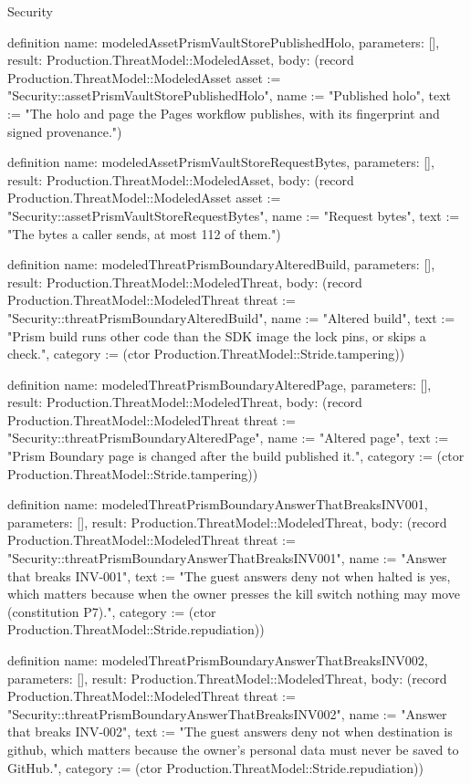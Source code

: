 \begin{lexlean}{Security}
\begin{semanticmodule}
definition{
  name: modeledAssetPrismVaultStorePublishedHolo,
  parameters: [],
  result: Production.ThreatModel::ModeledAsset,
  body: (record Production.ThreatModel::ModeledAsset {asset := "Security::assetPrismVaultStorePublishedHolo", name := "Published holo", text := "The holo and page the Pages workflow publishes, with its fingerprint and signed provenance."})
}

definition{
  name: modeledAssetPrismVaultStoreRequestBytes,
  parameters: [],
  result: Production.ThreatModel::ModeledAsset,
  body: (record Production.ThreatModel::ModeledAsset {asset := "Security::assetPrismVaultStoreRequestBytes", name := "Request bytes", text := "The bytes a caller sends, at most 112 of them."})
}

definition{
  name: modeledThreatPrismBoundaryAlteredBuild,
  parameters: [],
  result: Production.ThreatModel::ModeledThreat,
  body: (record Production.ThreatModel::ModeledThreat {threat := "Security::threatPrismBoundaryAlteredBuild", name := "Altered build", text := "Prism build runs other code than the SDK image the lock pins, or skips a check.", category := (ctor Production.ThreatModel::Stride.tampering)})
}

definition{
  name: modeledThreatPrismBoundaryAlteredPage,
  parameters: [],
  result: Production.ThreatModel::ModeledThreat,
  body: (record Production.ThreatModel::ModeledThreat {threat := "Security::threatPrismBoundaryAlteredPage", name := "Altered page", text := "Prism Boundary page is changed after the build published it.", category := (ctor Production.ThreatModel::Stride.tampering)})
}

definition{
  name: modeledThreatPrismBoundaryAnswerThatBreaksINV001,
  parameters: [],
  result: Production.ThreatModel::ModeledThreat,
  body: (record Production.ThreatModel::ModeledThreat {threat := "Security::threatPrismBoundaryAnswerThatBreaksINV001", name := "Answer that breaks INV-001", text := "The guest answers deny not when halted is yes, which matters because when the owner presses the kill switch nothing may move (constitution P7).", category := (ctor Production.ThreatModel::Stride.repudiation)})
}

definition{
  name: modeledThreatPrismBoundaryAnswerThatBreaksINV002,
  parameters: [],
  result: Production.ThreatModel::ModeledThreat,
  body: (record Production.ThreatModel::ModeledThreat {threat := "Security::threatPrismBoundaryAnswerThatBreaksINV002", name := "Answer that breaks INV-002", text := "The guest answers deny not when destination is github, which matters because the owner's personal data must never be saved to GitHub.", category := (ctor Production.ThreatModel::Stride.repudiation)})
}


\end{semanticmodule}
\end{lexlean}
